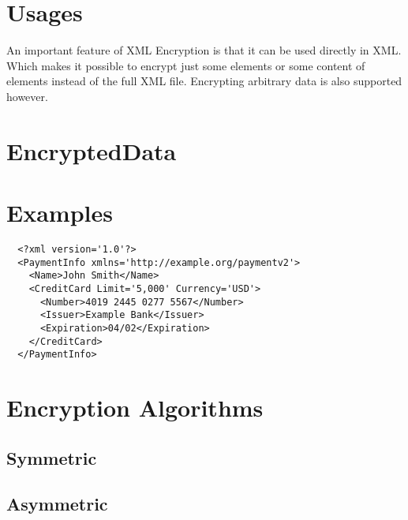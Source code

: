 \section{Usages}
An important feature of XML Encryption is that it can be used directly in XML\@.
Which makes it possible to encrypt just some elements or some content of
elements instead of the full XML file. Encrypting arbitrary data is also
supported however.
\section{EncryptedData}
\section{Examples}
\begin{verbatim}
  <?xml version='1.0'?>
  <PaymentInfo xmlns='http://example.org/paymentv2'>
    <Name>John Smith</Name>
    <CreditCard Limit='5,000' Currency='USD'>
      <Number>4019 2445 0277 5567</Number>
      <Issuer>Example Bank</Issuer>
      <Expiration>04/02</Expiration>
    </CreditCard>
  </PaymentInfo>
\end{verbatim}
\section{Encryption Algorithms}
\subsection{Symmetric}
\subsection{Asymmetric}


